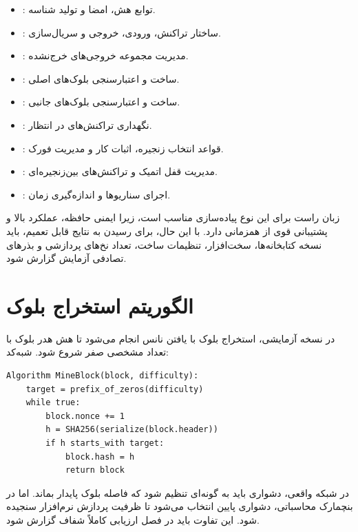 \begin{itemize}
\item {}: توابع هش، امضا و تولید شناسه.
\item {}: ساختار تراکنش، ورودی، خروجی و سریال‌سازی.
\item {}: مدیریت مجموعه خروجی‌های خرج‌نشده.
\item {}: ساخت و اعتبارسنجی بلوک‌های اصلی.
\item {}: ساخت و اعتبارسنجی بلوک‌های جانبی.
\item {}: نگهداری تراکنش‌های در انتظار.
\item {}: قواعد انتخاب زنجیره، اثبات کار و مدیریت فورک.
\item {}: مدیریت قفل اتمیک و تراکنش‌های بین‌زنجیره‌ای.
\item {}: اجرای سناریوها و اندازه‌گیری زمان.
\end{itemize}

زبان راست برای این نوع پیاده‌سازی مناسب است، زیرا ایمنی حافظه، عملکرد بالا و پشتیبانی قوی از همزمانی دارد. با این حال، برای رسیدن به نتایج قابل تعمیم، باید نسخه کتابخانه‌ها، سخت‌افزار، تنظیمات ساخت، تعداد نخ‌های پردازشی و بذرهای تصادفی آزمایش گزارش شود.

\section{الگوریتم استخراج بلوک}

در نسخه آزمایشی، استخراج بلوک با یافتن نانس انجام می‌شود تا هش هدر بلوک با تعداد مشخصی صفر شروع شود. شبه‌کد:

\begin{latin}
\begin{lstlisting}[basicstyle=\ttfamily\footnotesize]
Algorithm MineBlock(block, difficulty):
    target = prefix_of_zeros(difficulty)
    while true:
        block.nonce += 1
        h = SHA256(serialize(block.header))
        if h starts_with target:
            block.hash = h
            return block
\end{lstlisting}
\end{latin}

در شبکه واقعی، دشواری باید به گونه‌ای تنظیم شود که فاصله بلوک پایدار بماند. اما در بنچمارک محاسباتی، دشواری پایین انتخاب می‌شود تا ظرفیت پردازش نرم‌افزار سنجیده شود. این تفاوت باید در فصل ارزیابی کاملاً شفاف گزارش شود.

